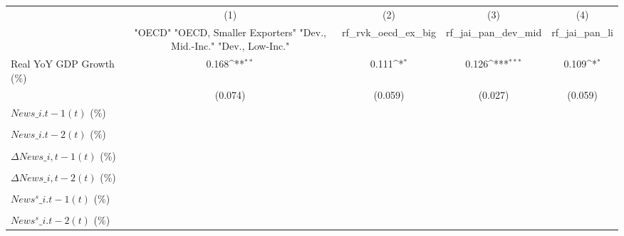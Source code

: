 {
\def\sym#1{\ifmmode^{#1}\else\(^{#1}\)\fi}
\begin{tabular}{l*{4}{c}}
\toprule
                    &\multicolumn{1}{c}{(1)}&\multicolumn{1}{c}{(2)}&\multicolumn{1}{c}{(3)}&\multicolumn{1}{c}{(4)}\\
                    &\multicolumn{1}{c}{ "OECD" "OECD, Smaller Exporters" "Dev., Mid.-Inc." "Dev., Low-Inc."}&\multicolumn{1}{c}{rf\_rvk\_oecd\_ex\_big}&\multicolumn{1}{c}{rf\_jai\_pan\_dev\_mid}&\multicolumn{1}{c}{rf\_jai\_pan\_li}\\
\midrule
Real YoY GDP Growth (\%)&       0.168\sym{**} &       0.111\sym{*}  &       0.126\sym{***}&       0.109\sym{*}  \\
                    &     (0.074)         &     (0.059)         &     (0.027)         &     (0.059)         \\
\addlinespace
$ News\_{i.t-1}(t)$ (\%)&                     &                     &                     &                     \\
                    &                     &                     &                     &                     \\
\addlinespace
$ News\_{i.t-2}(t)$ (\%)&                     &                     &                     &                     \\
                    &                     &                     &                     &                     \\
\addlinespace
$ \Delta News\_{i,t-1}(t)$ (\%)&                     &                     &                     &                     \\
                    &                     &                     &                     &                     \\
\addlinespace
$ \Delta News\_{i,t-2}(t)$ (\%)&                     &                     &                     &                     \\
                    &                     &                     &                     &                     \\
\addlinespace
$ News^s\_{i.t-1}(t)$ (\%)&                     &                     &                     &                     \\
                    &                     &                     &                     &                     \\
\addlinespace
$ News^s\_{i.t-2}(t)$ (\%)&                     &                     &                     &                     \\

\end{tabular}}
